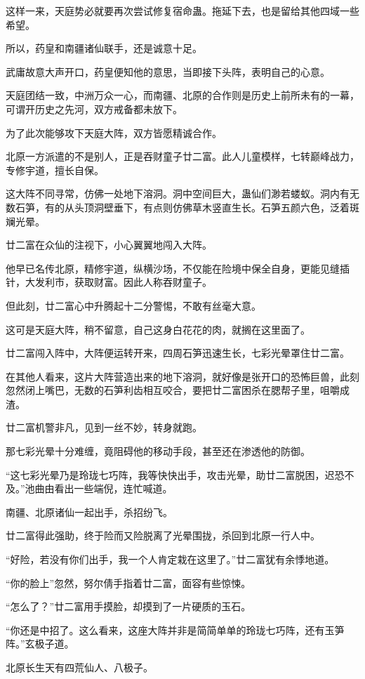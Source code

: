 \begin{this_body}
这样一来，天庭势必就要再次尝试修复宿命蛊。拖延下去，也是留给其他四域一些希望。

所以，药皇和南疆诸仙联手，还是诚意十足。

武庸故意大声开口，药皇便知他的意思，当即接下头阵，表明自己的心意。

天庭团结一致，中洲万众一心，而南疆、北原的合作则是历史上前所未有的一幕，可谓开历史之先河，双方戒备都未放下。

为了此次能够攻下天庭大阵，双方皆愿精诚合作。

北原一方派遣的不是别人，正是吞财童子廿二富。此人儿童模样，七转巅峰战力，专修宇道，擅长自保。

这大阵不同寻常，仿佛一处地下溶洞。洞中空间巨大，蛊仙们渺若蝼蚁。洞内有无数石笋，有的从头顶洞壁垂下，有点则仿佛草木竖直生长。石笋五颜六色，泛着斑斓光晕。

廿二富在众仙的注视下，小心翼翼地闯入大阵。

他早已名传北原，精修宇道，纵横沙场，不仅能在险境中保全自身，更能见缝插针，大发利市，获取财富。因此人称吞财童子。

但此刻，廿二富心中升腾起十二分警惕，不敢有丝毫大意。

这可是天庭大阵，稍不留意，自己这身白花花的肉，就搁在这里面了。

廿二富闯入阵中，大阵便运转开来，四周石笋迅速生长，七彩光晕罩住廿二富。

在其他人看来，这片大阵营造出来的地下溶洞，就好像是张开口的恐怖巨兽，此刻忽然闭上嘴巴，无数的石笋利齿相互咬合，要把廿二富困杀在腮帮子里，咀嚼成渣。

廿二富机警非凡，见到一丝不妙，转身就跑。

那七彩光晕十分难缠，竟阻碍他的移动手段，甚至还在渗透他的防御。

“这七彩光晕乃是玲珑七巧阵，我等快快出手，攻击光晕，助廿二富脱困，迟恐不及。”池曲由看出一些端倪，连忙喊道。

南疆、北原诸仙一起出手，杀招纷飞。

廿二富得此强助，终于险而又险脱离了光晕围拢，杀回到北原一行人中。

“好险，若没有你们出手，我一个人肯定栽在这里了。”廿二富犹有余悸地道。

“你的脸上”忽然，努尔倩手指着廿二富，面容有些惊悚。

“怎么了？”廿二富用手摸脸，却摸到了一片硬质的玉石。

“你还是中招了。这么看来，这座大阵并非是简简单单的玲珑七巧阵，还有玉笋阵。”玄极子道。

北原长生天有四荒仙人、八极子。


\end{this_body}
